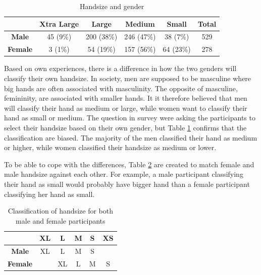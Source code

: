     \begin{table}[H]
      \centering
      \begin{tabular}{ c || c | c | c | c || c }
        \hline
        & {\bf Xtra Large} & {\bf Large} & {\bf Medium} & {\bf Small} & {\bf Total}\\ \hline
        {\bf Male} & 45 (9\%) & 200 (38\%) & 246 (47\%) & 38 (7\%) & 529 \\
        {\bf Female} & 3 (1\%) & 54 (19\%) & 157 (56\%) & 64 (23\%) & 278 \\ \hline
      \end{tabular}
      \caption{Handsize and gender}
      \label{tab:HandsizeGender}
    \end{table}

    Based on own experiences, there is a difference in how the two genders will classify their own handsize. In society, men are supposed to be masculine where big hands are often associated with masculinity. The opposite of masculine, femininity, are associated with smaller hands. It it therefore believed that men will classify their hand as medium or large, while women want to classify their hand as small or medium. The question in survey were asking the participants to select their handsize based on their own gender, but Table \ref{tab:HandsizeGender} confirms that the classification are biased. The majority of the men classified their hand as medium or higher, while women classified their handsize as medium or lower. 

    To be able to cope with the differences, Table \ref{tab:classificationhandsize} are created to match female and male handsize against each other. For example, a male participant classifying their hand as small would probably have bigger hand than a female participant classifying her hand as small. 

    \begin{table}[H]
      \centering
      \begin{tabular}{ c || c | c | c | c | c }
        \hline
         & {\bf XL} & {\bf L} & {\bf M} & {\bf S} & {\bf XS} \\ \hline\hline
        {\bf Male}   & XL & L  & M & S &   \\
        {\bf Female} &    & XL & L & M & S \\ \hline
      \end{tabular}
      \caption{Classification of handsize for both male and female participants}
      \label{tab:classificationhandsize}
    \end{table}

